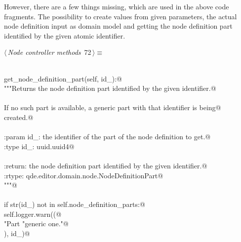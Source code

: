 \documentclass[
    a4paper,      %
    10pt,         %
    openright,    %
    notitlepage,  %
    parskip=half, %
]{scrreprt}       %
\theoremstyle{definition}                    %
\begin{document}
However, there are a few things missing, which are used in the above code
fragments. The possibility to create values from given parameters, the actual
node definition input as domain model and getting the node definition part
identified by the given atomic identifier.

\begin{flushleft} \small
\begin{minipage}{\linewidth}\label{scrap118}\raggedright\small
{} $\langle\,${\itshape Node controller methods}\nobreak\ {\footnotesize {72}}$\,\rangle\equiv$
\vspace{-1exm}
\begin{list}{}{} \item
\mbox{}\lstinline@@\\
\mbox{}\lstinline@def get_node_definition_part(self, id_):@\\
\mbox{}\lstinline@    """Returns the node definition part identified by the given identifier.@\\
\mbox{}\lstinline@@\\
\mbox{}\lstinline@    If no such part is available, a generic part with that identifier is being@\\
\mbox{}\lstinline@    created.@\\
\mbox{}\lstinline@@\\
\mbox{}\lstinline@    :param id_: the identifier of the part of the node definition to get.@\\
\mbox{}\lstinline@    :type  id_: uuid.uuid4@\\
\mbox{}\lstinline@@\\
\mbox{}\lstinline@    :return: the node definition part identified by the given identifier.@\\
\mbox{}\lstinline@    :rtype: qde.editor.domain.node.NodeDefinitionPart@\\
\mbox{}\lstinline@    """@\\
\mbox{}\lstinline@@\\
\mbox{}\lstinline@    if str(id_) not in self.node_definition_parts:@\\
\mbox{}\lstinline@        self.logger.warn((@\\
\mbox{}\lstinline@            "Part %s of the node definition was not found. Creating a"@\\
\mbox{}\lstinline@            "generic one."@\\
\mbox{}\lstinline@        ), id_)@\\
\mbox{}\lstinline@@\\

\end{list}
\end{minipage}
\end{flushleft}
\end{document}
